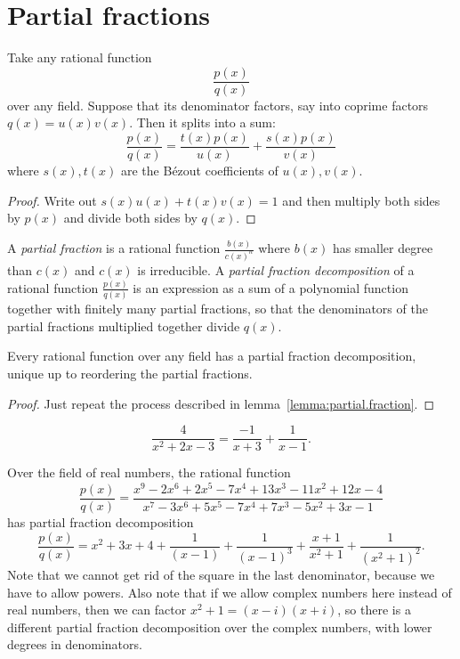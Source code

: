 \section{Partial fractions}

\begin{lemma}\label{lemma:partial.fraction}
Take any rational function 
\[
\frac{p(x)}{q(x)}
\]
over any field.
Suppose that its denominator factors, say into coprime factors \(q(x)=u(x)v(x)\).
Then it splits into a sum:
\[
\frac{p(x)}{q(x)}=\frac{t(x)p(x)}{u(x)} + \frac{s(x)p(x)}{v(x)}
\]
where \(s(x), t(x)\) are the B\'ezout coefficients of \(u(x), v(x)\).
\end{lemma}
\begin{proof}
Write out \(s(x)u(x)+t(x)v(x)=1\) and then multiply both sides by \(p(x)\) and divide both sides by \(q(x)\).
\end{proof}

A \emph{partial fraction} is a rational function \(\frac{b(x)}{c(x)^n}\) where \(b(x)\) has smaller degree than \(c(x)\) and \(c(x)\) is irreducible.
A \emph{partial fraction decomposition}
of a rational function \(\frac{p(x)}{q(x)}\) is an expression as a sum of a polynomial function together with finitely many partial fractions, so that the denominators of the partial fractions multiplied together divide \(q(x)\).

\begin{theorem}
Every rational function over any field has a partial fraction decomposition, unique up to reordering the partial fractions.
\end{theorem}
\begin{proof}
Just repeat the process described in lemma~\vref{lemma:partial.fraction}.
\end{proof}

\begin{example}
\[
\frac{4}{x^2+2x-3} = \frac{-1}{x+3} + \frac{1}{x-1}.
\]
\end{example}
\begin{example}
Over the field of real numbers, the rational function
\[
\frac{p(x)}{q(x)}=
\frac{x^9-2x^6+2x^5-7x^4+13x^3-11x^2+12x-4}{x^7-3x^6+5x^5-7x^4+7x^3-5x^2+3x-1}
\]
has partial fraction decomposition
\[
\frac{p(x)}{q(x)}
=
x^2+3x+4+\frac{1}{(x-1)} + \frac{1}{(x - 1)^3} + \frac{x + 1}{x^2+1}+\frac{1}{(x^2+1)^2}.
\]
Note that we cannot get rid of the square in the last denominator, because we have to allow powers.
Also note that if we allow complex numbers here instead of real numbers, then we can factor \(x^2+1=(x-i)(x+i)\), so there is a different partial fraction decomposition over the complex numbers, with lower degrees in denominators.
\end{example}

